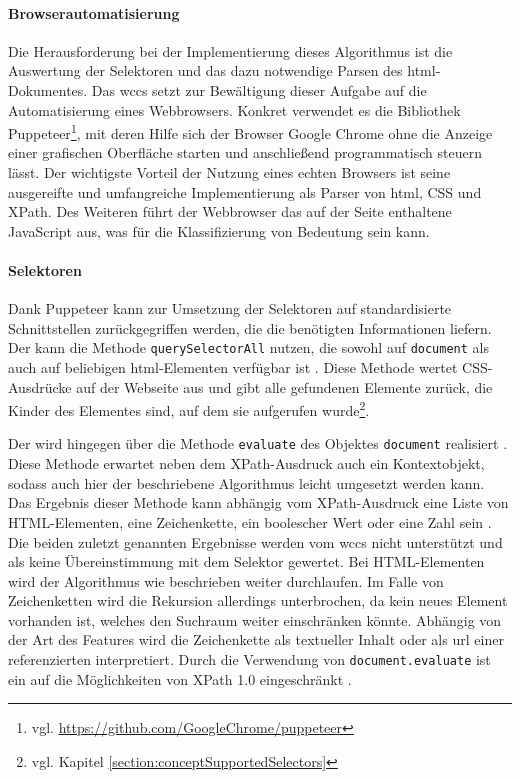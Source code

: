     \paragraph{Browserautomatisierung}
    Die Herausforderung bei der Implementierung dieses Algorithmus
    ist die Auswertung der Selektoren und das dazu notwendige Parsen des \gls{html}-Dokumentes.
    Das \gls{wccs} setzt zur Bewältigung dieser Aufgabe auf die Automatisierung eines Webbrowsers.
    Konkret verwendet es die Bibliothek
    Puppeteer\footnote{vgl. \url{https://github.com/GoogleChrome/puppeteer}},
    mit deren Hilfe sich der Browser Google Chrome ohne die Anzeige einer grafischen Oberfläche starten
    und anschließend programmatisch steuern lässt.
    Der wichtigste Vorteil der Nutzung eines echten Browsers ist seine ausgereifte und umfangreiche Implementierung
    als Parser von \gls{html}, CSS und XPath.
    Des Weiteren führt der Webbrowser das auf der Seite enthaltene JavaScript aus,
    was für die Klassifizierung von Bedeutung sein kann.

    \paragraph{Selektoren}
    Dank Puppeteer kann zur Umsetzung der Selektoren auf standardisierte Schnittstellen
    zurückgegriffen werden, die die benötigten Informationen liefern.
    Der {\cssSelector} kann die Methode \texttt{querySelectorAll} nutzen,
    die sowohl auf \texttt{document} als auch auf beliebigen \gls{html}-Elementen verfügbar ist
    \cite[Kapitel 6.1]{w3c:selectorsAPI}.
    Diese Methode wertet CSS-Ausdrücke auf der Webseite aus und gibt alle gefundenen Elemente zurück,
    die Kinder des Elementes sind, auf dem sie aufgerufen
    wurde\footnote{vgl. Kapitel \ref{section:conceptSupportedSelectors}}.

    Der {\xpathSelector} wird hingegen über die Methode \texttt{evaluate} des Objektes \texttt{document} realisiert
    \cite[Kapitel 1.4]{w3c:domXPath}.
    Diese Methode erwartet neben dem XPath-Ausdruck auch ein Kontextobjekt,
    sodass auch hier der beschriebene Algorithmus leicht umgesetzt werden kann.
    Das Ergebnis dieser Methode kann abhängig vom XPath-Ausdruck eine Liste von HTML-Elementen, eine Zeichenkette,
    ein boolescher Wert oder eine Zahl sein
    \cite[Kapitel 1.4]{w3c:domXPath}.
    Die beiden zuletzt genannten Ergebnisse werden vom \gls{wccs} nicht unterstützt und als keine Übereinstimmung mit dem Selektor gewertet.
    Bei HTML-Elementen wird der Algorithmus wie beschrieben weiter durchlaufen.
    Im Falle von Zeichenketten wird die Rekursion allerdings unterbrochen, da kein neues Element vorhanden ist,
    welches den Suchraum weiter einschränken könnte.
    Abhängig von der Art des Features wird die Zeichenkette als textueller Inhalt
    oder als \gls{url} einer referenzierten {\resource} interpretiert.
    Durch die Verwendung von \texttt{document.evaluate} ist ein {\xpathSelector}
    auf die Möglichkeiten von XPath 1.0 eingeschränkt \cite{w3c:domXPath}.

